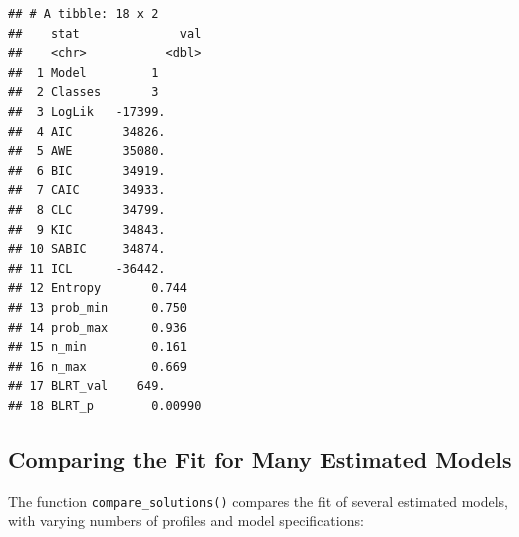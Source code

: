 \documentclass[english,man]{apa6}
\newenvironment{Shaded}{\begin{snugshade}}{\end{snugshade}}
\newcommand{\DataTypeTok}[1]{\textcolor[rgb]{0.13,0.29,0.53}{#1}}
\newcommand{\DecValTok}[1]{\textcolor[rgb]{0.00,0.00,0.81}{#1}}
\newcommand{\KeywordTok}[1]{\textcolor[rgb]{0.13,0.29,0.53}{\textbf{#1}}}
\newcommand{\NormalTok}[1]{#1}
\newcommand{\OperatorTok}[1]{\textcolor[rgb]{0.81,0.36,0.00}{\textbf{#1}}}
\newcommand{\StringTok}[1]{\textcolor[rgb]{0.31,0.60,0.02}{#1}}
\begin{document}
\begin{Shaded}
\end{Shaded}

\begin{verbatim}
## # A tibble: 18 x 2
##    stat              val
##    <chr>           <dbl>
##  1 Model         1      
##  2 Classes       3      
##  3 LogLik   -17399.     
##  4 AIC       34826.     
##  5 AWE       35080.     
##  6 BIC       34919.     
##  7 CAIC      34933.     
##  8 CLC       34799.     
##  9 KIC       34843.     
## 10 SABIC     34874.     
## 11 ICL      -36442.     
## 12 Entropy       0.744  
## 13 prob_min      0.750  
## 14 prob_max      0.936  
## 15 n_min         0.161  
## 16 n_max         0.669  
## 17 BLRT_val    649.     
## 18 BLRT_p        0.00990
\end{verbatim}

\hypertarget{comparing-the-fit-for-many-estimated-models}{%
\subsection{Comparing the Fit for Many Estimated Models}\label{comparing-the-fit-for-many-estimated-models}}

The function \texttt{compare\_solutions()} compares the fit of several estimated models,
with varying numbers of profiles and model specifications:

\begin{Shaded}
\end{Shaded}
\end{document}
